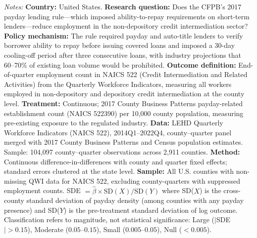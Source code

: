 \begin{table}[htbp]
\begin{tablenotes}[flushleft]
\item \textit{Notes:} \textbf{Country:} United States. \textbf{Research question:} Does the CFPB's 2017 payday lending rule---which imposed ability-to-repay requirements on short-term lenders---reduce employment in the non-depository credit intermediation sector? \textbf{Policy mechanism:} The rule required payday and auto-title lenders to verify borrower ability to repay before issuing covered loans and imposed a 30-day cooling-off period after three consecutive loans, with industry projections that 60--70\% of existing loan volume would be prohibited. \textbf{Outcome definition:} End-of-quarter employment count in NAICS 522 (Credit Intermediation and Related Activities) from the Quarterly Workforce Indicators, measuring all workers employed in non-depository and depository credit intermediation at the county level. \textbf{Treatment:} Continuous; 2017 County Business Patterns payday-related establishment count (NAICS 522390) per 10,000 county population, measuring pre-existing exposure to the regulated industry. \textbf{Data:} LEHD Quarterly Workforce Indicators (NAICS 522), 2014Q1--2022Q4, county--quarter panel merged with 2017 County Business Patterns and Census population estimates. Sample: 104,097 county--quarter observations across 2,911 counties. \textbf{Method:} Continuous difference-in-differences with county and quarter fixed effects; standard errors clustered at the state level. \textbf{Sample:} All U.S. counties with non-missing QWI data for NAICS 522, excluding county-quarters with suppressed employment counts. SDE $= \hat{\beta} \times \text{SD}(X) / \text{SD}(Y)$ where SD($X$) is the cross-county standard deviation of payday density (among counties with any payday presence) and SD($Y$) is the pre-treatment standard deviation of log outcome. Classification refers to magnitude, not statistical significance: Large ($|$SDE$| > 0.15$), Moderate ($0.05$--$0.15$), Small ($0.005$--$0.05$), Null ($< 0.005$).
\end{tablenotes}
\end{table}


